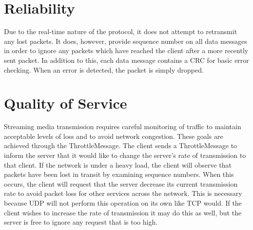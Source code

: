 \documentclass[12pt,letterpaper,titlepage]{article}
\begin{document}
\section{Reliability}
Due to the real-time nature of the protocol, it does not attempt to retransmit any lost packets. It does, however, provide sequence number on all data messages in order to ignore any packets which have reached the client after a more recently sent packet. In addition to this, each data message contains a CRC for basic error checking. When an error is detected, the packet is simply dropped.

\section{Quality of Service}
Streaming media transmission requires careful monitoring of traffic to maintain acceptable levels of loss and to avoid network congestion. These goals are achieved through the ThrottleMessage. The client sends a ThrottleMessage to inform the server that it would like to change the server's rate of transmission to that client. If the network is under a heavy load, the client will observe that packets have been lost in transit by examining sequence numbers. When this occurs, the client will request that the server decrease its current transmission rate to avoid packet loss for other services across the network. This is necessary because UDP will not perform this operation on its own like TCP would. If the client wishes to increase the rate of transmission it may do this as well, but the server is free to ignore any request that is too high.
\end{document}
